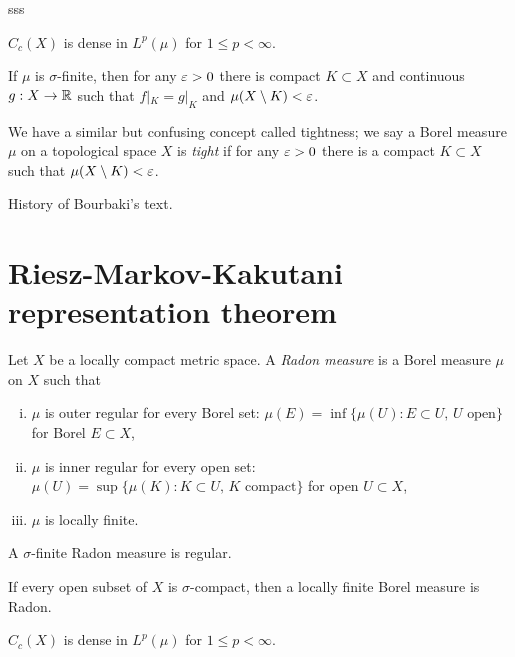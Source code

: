 \documentclass{../../large}
\begin{document}
\begin{prb}
sss
\begin{parts}
\item $C_c(X)$ is dense in $L^p(\mu)$ for $1\le p<\infty$.
\item If $\mu$ is $\sigma$-finite, then for any $\varepsilon>0$ there is compact $K\subset X$ and continuous $g:X\to\mathbb{R}$ such that $f|_K=g|_K$ and $\mu(X\setminus K)<\varepsilon$.
\end{parts}
\end{prb}


\begin{prb}
We have a similar but confusing concept called tightness; we say a Borel measure $\mu$ on a topological space $X$ is \emph{tight} if for any $\varepsilon>0$ there is a compact $K\subset X$ such that $\mu(X\setminus K)<\varepsilon$.

History of Bourbaki's text.
\begin{parts}
\item
\end{parts}
\end{prb}





\section{Riesz-Markov-Kakutani representation theorem}




\begin{prb}
Let $X$ be a locally compact metric space.
A \emph{Radon measure} is a Borel measure $\mu$ on $X$ such that
\begin{enumerate}[(i)]
\item $\mu$ is outer regular for every Borel set: $\mu(E)=\inf\{\mu(U):E\subset U,\,U\text{ open}\}$ for Borel $E\subset X$,
\item $\mu$ is inner regular for every open set: $\mu(U)=\sup\{\mu(K):K\subset U,\,K\text{ compact}\}$ for open $U\subset X$,
\item $\mu$ is locally finite.
\end{enumerate}
\begin{parts}
\item A $\sigma$-finite Radon measure is regular.
\item If every open subset of $X$ is $\sigma$-compact, then a locally finite Borel measure is Radon.
\item $C_c(X)$ is dense in $L^p(\mu)$ for $1\le p<\infty$.
\end{parts}
\end{prb}
\end{document}
